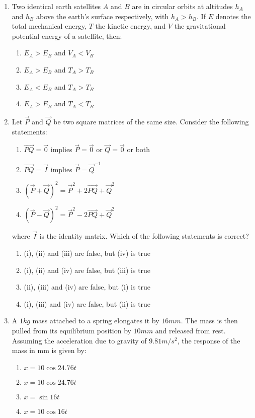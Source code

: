 \documentclass[journal]{IEEEtran}
\begin{document}
\begin{enumerate}
    \item Two identical earth satellites $A$ and $B$ are in circular orbits at altitudes $h_A$
    and $h_B$ above the earth's surface respectively, with $h_A > h_B$. If $E$ denotes the total
    mechanical energy, $T$ the kinetic energy, and $V$ the gravitational potential energy of a
    satellite, then:
    \begin{multicols}{2}
        \begin{enumerate}
            \item $E_A > E_B$ and $V_A < V_B$
            \item $E_A > E_B$ and $T_A > T_B$
            \item $E_A < E_B$ and $T_A > T_B$
            \item $E_A > E_B$ and $T_A < T_B$
        \end{enumerate}
    \end{multicols}

    \item Let $\vec{P}$ and $\vec{Q}$ be two square matrices of the same size. Consider the following statements:
    \begin{enumerate}[label=(\roman*)]
        \item $\vec{PQ} = \vec{0}$ implies $\vec{P} = \vec{0}$ or $\vec{Q} = \vec{0}$ or both
        \item $\vec{PQ} = \vec{I}$ implies $\vec{P} = \vec{Q}^{-1}$
        \item $(\vec{P} + \vec{Q})^2 = \vec{P}^2 + 2\vec{PQ} + \vec{Q}^2$
        \item $(\vec{P} - \vec{Q})^2 = \vec{P}^2 - 2\vec{PQ} + \vec{Q}^2$
    \end{enumerate}
    where $\vec{I}$ is the identity matrix. Which of the following statements is correct?
    \begin{enumerate}
        \item (i), (ii) and (iii) are false, but (iv) is true
        \item (i), (ii) and (iv) are false, but (iii) is true
        \item (ii), (iii) and (iv) are false, but (i) is true
        \item (i), (iii) and (iv) are false, but (ii) is true
    \end{enumerate}

    \item A $1 kg$ mass attached to a spring elongates it by $16 mm$. The mass is then pulled from its
    equilibrium position by $10 mm$ and released from rest. Assuming the acceleration due to gravity
    of $9.81 m/s^2$, the response of the mass in mm is given by:
    \begin{multicols}{2}
        \begin{enumerate}
            \item $x = 10 \cos 24.76t$
            \item $x = 10 \cos 24.76t$
            \item $x = \sin 16t$
            \item $x = 10 \cos 16t$
        \end{enumerate}
    \end{multicols}


\end{enumerate}
\end{document}
